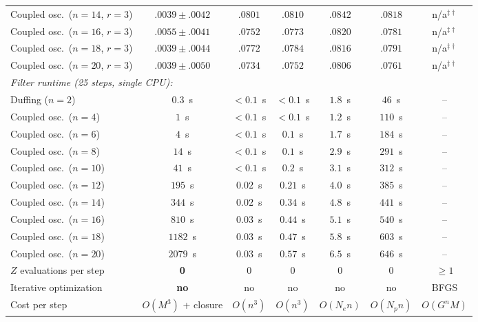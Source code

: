 \documentclass{article}
\theoremstyle{definition}
\begin{document}
\begin{table}[ht]
\begin{tabular}{lcccccc}
Coupled osc.\ ($n{=}14$, $r{=}3$) & $\mathbf{.0039\!\pm\!.0042}$ & $.0801$ & $.0810$ & $.0842$ & $.0818$ & n/a$^{\ddagger\dagger}$ \\
Coupled osc.\ ($n{=}16$, $r{=}3$) & $\mathbf{.0055\!\pm\!.0041}$ & $.0752$ & $.0773$ & $.0820$ & $.0781$ & n/a$^{\ddagger\dagger}$ \\
Coupled osc.\ ($n{=}18$, $r{=}3$) & $\mathbf{.0039\!\pm\!.0044}$ & $.0772$ & $.0784$ & $.0816$ & $.0791$ & n/a$^{\ddagger\dagger}$ \\
Coupled osc.\ ($n{=}20$, $r{=}3$) & $\mathbf{.0039\!\pm\!.0050}$ & $.0734$ & $.0752$ & $.0806$ & $.0761$ & n/a$^{\ddagger\dagger}$ \\
\midrule
\multicolumn{7}{l}{\emph{Filter runtime (25 steps, single CPU):}} \\
Duffing ($n{=}2$) & $0.3$~s & ${<}0.1$~s & ${<}0.1$~s & $1.8$~s & $46$~s & -- \\
Coupled osc.\ ($n{=}4$) & $1$~s & ${<}0.1$~s & ${<}0.1$~s & $1.2$~s & $110$~s & -- \\
Coupled osc.\ ($n{=}6$) & $4$~s & ${<}0.1$~s & $0.1$~s & $1.7$~s & $184$~s & -- \\
Coupled osc.\ ($n{=}8$) & $14$~s & ${<}0.1$~s & $0.1$~s & $2.9$~s & $291$~s & -- \\
Coupled osc.\ ($n{=}10$) & $41$~s & ${<}0.1$~s & $0.2$~s & $3.1$~s & $312$~s & -- \\
Coupled osc.\ ($n{=}12$) & $195$~s & $0.02$~s & $0.21$~s & $4.0$~s & $385$~s & -- \\
Coupled osc.\ ($n{=}14$) & $344$~s & $0.02$~s & $0.34$~s & $4.8$~s & $441$~s & -- \\
Coupled osc.\ ($n{=}16$) & $810$~s & $0.03$~s & $0.44$~s & $5.1$~s & $540$~s & -- \\
Coupled osc.\ ($n{=}18$) & $1182$~s & $0.03$~s & $0.47$~s & $5.8$~s & $603$~s & -- \\
Coupled osc.\ ($n{=}20$) & $2079$~s & $0.03$~s & $0.57$~s & $6.5$~s & $646$~s & -- \\
\midrule
$Z$ evaluations per step & \textbf{0} & 0 & 0 & 0 & 0 & $\ge 1$ \\
Iterative optimization & \textbf{no} & no & no & no & no & BFGS \\
Cost per step & $O(M^3)$ + closure & $O(n^3)$ & $O(n^3)$ & $O(N_e n)$ & $O(N_p n)$ & $O(G^n M)$ \\
\bottomrule
\end{tabular}


\end{table}
\end{document}

